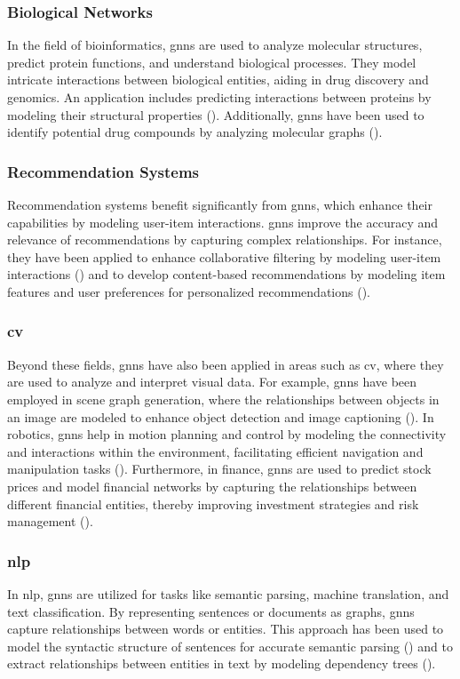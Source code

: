 \subsubsection*{Biological Networks}
In the field of bioinformatics, \glspl{gnn} are used to analyze molecular structures, predict protein functions, and understand biological processes.
They model intricate interactions between biological entities, aiding in drug discovery and genomics.
An application includes predicting interactions between proteins by modeling their structural properties (\cite{Fout2017}).
Additionally, \glspl{gnn} have been used to identify potential drug compounds by analyzing molecular graphs (\cite{Jin2018}).

\subsubsection*{Recommendation Systems}
Recommendation systems benefit significantly from \glspl{gnn}, which enhance their capabilities by modeling user-item interactions.
\glspl{gnn} improve the accuracy and relevance of recommendations by capturing complex relationships.
For instance, they have been applied to enhance collaborative filtering by modeling user-item interactions (\cite{Wang2019}) and to develop content-based recommendations by modeling item features and user preferences for personalized recommendations (\cite{Ying2018}).

\subsubsection*{\gls{cv}}
Beyond these fields, \glspl{gnn} have also been applied in areas such as \gls{cv}, where they are used to analyze and interpret visual data.
For example, \glspl{gnn} have been employed in scene graph generation, where the relationships between objects in an image are modeled to enhance object detection and image captioning (\cite{Yang_2018_ECCV}).
In robotics, \glspl{gnn} help in motion planning and control by modeling the connectivity and interactions within the environment, facilitating efficient navigation and manipulation tasks (\cite{Sanchez2018}).
Furthermore, in finance, \glspl{gnn} are used to predict stock prices and model financial networks by capturing the relationships between different financial entities, thereby improving investment strategies and risk management (\cite{Wang2021}).

\subsubsection*{\acrlong{nlp}}
In \gls{nlp}, \glspl{gnn} are utilized for tasks like semantic parsing, machine translation, and text classification.
By representing sentences or documents as graphs, \glspl{gnn} capture relationships between words or entities. This approach has been used to model the syntactic structure of sentences for accurate semantic parsing (\cite{Zeng2019}) and to extract relationships between entities in text by modeling dependency trees (\cite{Sahu2019}).

